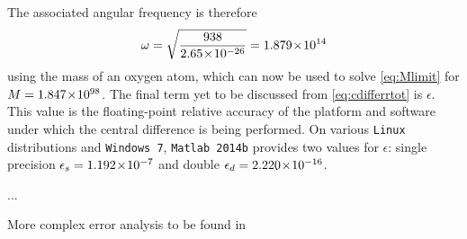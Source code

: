 The associated angular frequency is therefore
\begin{equation}
\omega=\sqrt{\frac{938}{2.65\!\times\!10^{-26}}}=1.879\!\times\!10^{14}
\end{equation}
using the mass of an oxygen atom, which can now be used to solve \cref{eq:Mlimit} for $M = 1.847\!\times\!10^{98}$.
The final term yet to be discussed from \cref{eq:cdifferrtot} is $\epsilon$.
This value is the floating-point relative accuracy of the platform and software under which the central difference is being performed.
On various \texttt{Linux} distributions and \texttt{Windows 7}, \texttt{Matlab 2014b} provides two values for $\epsilon$: single precision $\epsilon_s = 1.192\!\times\!10^{-7}$ and double $\epsilon_d = 2.220\!\times\!10^{-16}$.

...

More complex error analysis to be found in \cite{Mathur2012}



